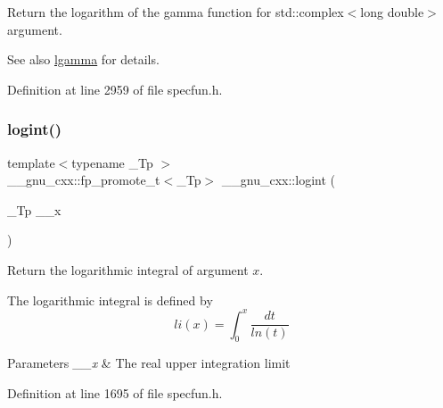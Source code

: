 Return the logarithm of the gamma function for {\ttfamily  std\+::complex$<$long double$>$ } argument.

\begin{DoxySeeAlso}{See also}
\hyperlink{group__gnu__math__spec__func_ga40fa5127f7c419ed1d8f1c6a6f96ea9b}{lgamma} for details. 
\end{DoxySeeAlso}


Definition at line 2959 of file specfun.\+h.

\mbox{\label{group__gnu__math__spec__func_ga1c0fe0f4cb72041f24db82dc7e47df11}} 
\subsubsection{\texorpdfstring{logint()}{logint()}}
{\footnotesize\ttfamily template$<$typename \+\_\+\+Tp $>$ \\
\+\_\+\+\_\+gnu\+\_\+cxx\+::fp\+\_\+promote\+\_\+t$<$\+\_\+\+Tp$>$ \+\_\+\+\_\+gnu\+\_\+cxx\+::logint (\begin{DoxyParamCaption}\item[{\+\_\+\+Tp}]{\+\_\+\+\_\+x }\end{DoxyParamCaption})\hspace{0.3cm}{\ttfamily [inline]}}

Return the logarithmic integral of argument $ x $.

The logarithmic integral is defined by \[ li(x) = \int_0^x \frac{dt}{ln(t)} \]


\begin{DoxyParams}{Parameters}
{\em \+\_\+\+\_\+x} & The real upper integration limit \\
\hline
\end{DoxyParams}


Definition at line 1695 of file specfun.\+h.

\mbox{\label{group__gnu__math__spec__func_gab878da3ba2f5c1d49d96eadde533b233}} 
